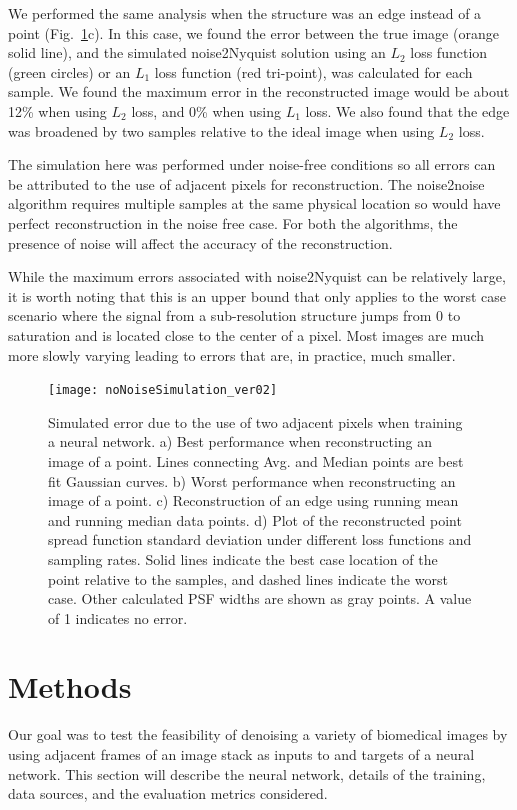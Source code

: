 \documentclass[12pt]{spieman}
\begin{document}
\begin{spacing}{2}
We performed the same analysis when the structure was an edge instead of a point (Fig.~\ref{fig:noiselessSim}c). In this case, we found the error between the true image (orange solid line), and the simulated noise2Nyquist solution using an $L_2$ loss function (green circles) or an $L_1$ loss function (red tri-point), was calculated for each sample. We found the maximum error in the reconstructed image would be about 12\% when using $L_2$ loss, and 0\% when using $L_1$ loss. We also found that the edge was broadened by two samples relative to the ideal image when using $L_2$ loss. 

The simulation here was performed under noise-free conditions so all errors can be attributed to the use of adjacent pixels for reconstruction. The noise2noise algorithm requires multiple samples at the same physical location so would have perfect reconstruction in the noise free case. For both the algorithms, the presence of noise will affect the accuracy of the reconstruction.

While the maximum errors associated with noise2Nyquist can be relatively large, it is worth noting that this is an upper bound that only applies to the worst case scenario where the signal from a sub-resolution structure jumps from 0 to saturation and is located close to the center of a pixel. Most images are much more slowly varying leading to errors that are, in practice, much smaller. 

\begin{figure}[hbt]
	\begin{center}
		\texttt{[image: noNoiseSimulation\_ver02]}
		\caption{\label{fig:noiselessSim} Simulated error due to the use of two adjacent pixels when training a neural network. a) Best performance when reconstructing an image of a point. Lines connecting Avg. and Median points are best fit Gaussian curves. b) Worst performance when reconstructing an image of a point. c) Reconstruction of an edge using running mean and running median data points. d) Plot of the reconstructed point spread function standard deviation under different loss functions and sampling rates. Solid lines indicate the best case location of the point relative to the samples, and dashed lines indicate the worst case. Other calculated PSF widths are shown as gray points. A value of 1 indicates no error. }
	\end{center}
\end{figure}

\section{Methods}
Our goal was to test the feasibility of denoising a variety of biomedical images by using adjacent frames of an image stack as inputs to and targets of a neural network. This section will describe the neural network, details of the training, data sources, and the evaluation metrics considered.


\end{spacing}
\end{document}
